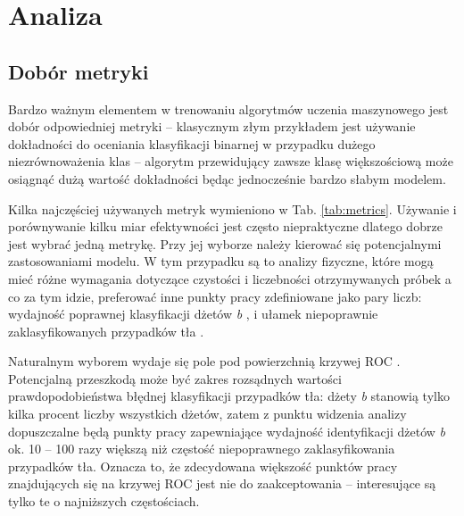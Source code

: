 \section{Analiza}
\label{sec:analiza}


\subsection{Dobór metryki}

Bardzo ważnym elementem w trenowaniu algorytmów uczenia maszynowego jest dobór odpowiedniej metryki -- klasycznym złym przykładem jest używanie dokładności  do oceniania klasyfikacji binarnej w przypadku dużego niezrównoważenia klas -- algorytm przewidujący zawsze klasę większościową może osiągnąć dużą wartość dokładności będąc jednocześnie bardzo słabym modelem.

Kilka najczęściej używanych metryk wymieniono w Tab. \ref{tab:metrics}. Używanie i porównywanie kilku miar efektywności jest często niepraktyczne dlatego dobrze jest wybrać jedną metrykę. Przy jej wyborze należy kierować się potencjalnymi zastosowaniami modelu. W tym przypadku są to analizy fizyczne, które mogą mieć różne wymagania dotyczące czystości i liczebności otrzymywanych próbek a co za tym idzie, preferować inne punkty pracy zdefiniowane jako pary liczb: wydajność poprawnej klasyfikacji dżetów \textit{b} , i ułamek niepoprawnie zaklasyfikowanych przypadków tła . 

Naturalnym wyborem wydaje się pole pod powierzchnią krzywej ROC  \cite{bradley1997use}. Potencjalną przeszkodą może być zakres rozsądnych wartości prawdopodobieństwa błędnej klasyfikacji przypadków tła: dżety \textit{b} stanowią tylko kilka procent liczby wszystkich dżetów, zatem z punktu widzenia analizy dopuszczalne będą punkty pracy zapewniające wydajność identyfikacji dżetów \textit{b} ok. 10 -- 100 razy większą niż częstość niepoprawnego zaklasyfikowania przypadków tła. Oznacza to, że zdecydowana większość punktów pracy znajdujących się na krzywej ROC jest nie do zaakceptowania -- interesujące są tylko te o najniższych częstościach.

